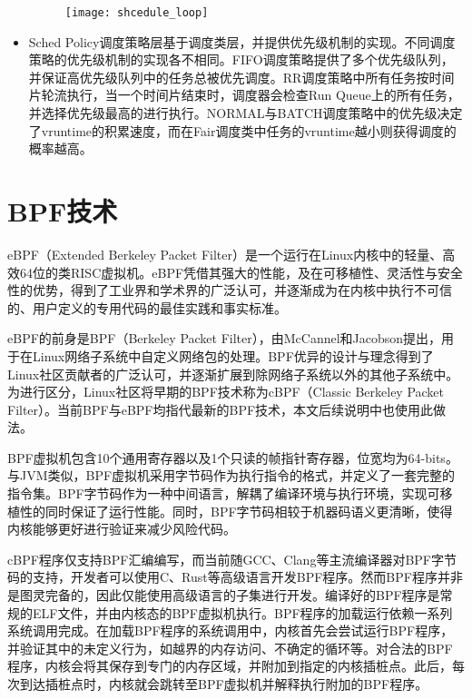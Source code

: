 \begin{itemize}
\begin{figure}[!htbp]
    \centering 
    \texttt{[image: shcedule\_loop]}
    \label{fig:shcedule_loop}
\end{figure}

    \item Sched Policy调度策略层基于调度类层，并提供优先级机制的实现。不同调度策略的优先级机制的实现各不相同。FIFO调度策略提供了多个优先级队列，并保证高优先级队列中的任务总被优先调度。RR调度策略中所有任务按时间片轮流执行，当一个时间片结束时，调度器会检查Run Queue上的所有任务，并选择优先级最高的进行执行。NORMAL与BATCH调度策略中的优先级决定了vruntime的积累速度，而在Fair调度类中任务的vruntime越小则获得调度的概率越高。

\end{itemize}

\section{BPF技术}


eBPF（Extended Berkeley Packet Filter）是一个运行在Linux内核中的轻量、高效64位的类RISC虚拟机\citep{sharaf2022extended}。eBPF凭借其强大的性能，及在可移植性、灵活性与安全性的优势，得到了工业界和学术界的广泛认可，并逐渐成为在内核中执行不可信的、用户定义的专用代码的最佳实践和事实标准。

eBPF的前身是BPF（Berkeley Packet Filter），由McCannel和Jacobson提出\citep{mccanne1993bsd}，用于在Linux网络子系统中自定义网络包的处理。BPF优异的设计与理念得到了Linux社区贡献者的广泛认可，并逐渐扩展到除网络子系统以外的其他子系统中。为进行区分，Linux社区将早期的BPF技术称为cBPF（Classic Berkeley Packet Filter）。当前BPF与eBPF均指代最新的BPF技术，本文后续说明中也使用此做法。

BPF虚拟机包含10个通用寄存器以及1个只读的帧指针寄存器，位宽均为64-bits。与JVM类似，BPF虚拟机采用字节码作为执行指令的格式，并定义了一套完整的指令集。BPF字节码作为一种中间语言，解耦了编译环境与执行环境，实现可移植性的同时保证了运行性能。同时，BPF字节码相较于机器码语义更清晰，使得内核能够更好进行验证来减少风险代码。

cBPF程序仅支持BPF汇编编写，而当前随GCC、Clang等主流编译器对BPF字节码的支持，开发者可以使用C、Rust等高级语言开发BPF程序\citep{ebpfguidence}。然而BPF程序并非是图灵完备的，因此仅能使用高级语言的子集进行开发。编译好的BPF程序是常规的ELF文件，并由内核态的BPF虚拟机执行。BPF程序的加载运行依赖一系列系统调用完成。在加载BPF程序的系统调用中，内核首先会尝试运行BPF程序，并验证其中的未定义行为，如越界的内存访问、不确定的循环等。对合法的BPF程序，内核会将其保存到专门的内存区域，并附加到指定的内核插桩点。此后，每次到达插桩点时，内核就会跳转至BPF虚拟机并解释执行附加的BPF程序。

